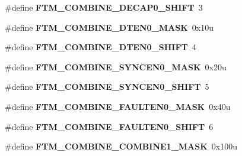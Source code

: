 \begin{DoxyCompactItemize}
\item 
\hypertarget{group___f_t_m___register___masks_ga4bfcf4d8cf838ad852c50cf589fd3d95}{}\#define {\bfseries F\+T\+M\+\_\+\+C\+O\+M\+B\+I\+N\+E\+\_\+\+D\+E\+C\+A\+P0\+\_\+\+S\+H\+I\+F\+T}~3\label{group___f_t_m___register___masks_ga4bfcf4d8cf838ad852c50cf589fd3d95}

\item 
\hypertarget{group___f_t_m___register___masks_ga9722d2bdaba256dd90324aa6b199ee4f}{}\#define {\bfseries F\+T\+M\+\_\+\+C\+O\+M\+B\+I\+N\+E\+\_\+\+D\+T\+E\+N0\+\_\+\+M\+A\+S\+K}~0x10u\label{group___f_t_m___register___masks_ga9722d2bdaba256dd90324aa6b199ee4f}

\item 
\hypertarget{group___f_t_m___register___masks_gaab1a185d98eb899fea411daf0386858a}{}\#define {\bfseries F\+T\+M\+\_\+\+C\+O\+M\+B\+I\+N\+E\+\_\+\+D\+T\+E\+N0\+\_\+\+S\+H\+I\+F\+T}~4\label{group___f_t_m___register___masks_gaab1a185d98eb899fea411daf0386858a}

\item 
\hypertarget{group___f_t_m___register___masks_gafd208921dc5f1d7dde730c67776bce8a}{}\#define {\bfseries F\+T\+M\+\_\+\+C\+O\+M\+B\+I\+N\+E\+\_\+\+S\+Y\+N\+C\+E\+N0\+\_\+\+M\+A\+S\+K}~0x20u\label{group___f_t_m___register___masks_gafd208921dc5f1d7dde730c67776bce8a}

\item 
\hypertarget{group___f_t_m___register___masks_gab9eba65827e4b667e34b89f58640b960}{}\#define {\bfseries F\+T\+M\+\_\+\+C\+O\+M\+B\+I\+N\+E\+\_\+\+S\+Y\+N\+C\+E\+N0\+\_\+\+S\+H\+I\+F\+T}~5\label{group___f_t_m___register___masks_gab9eba65827e4b667e34b89f58640b960}

\item 
\hypertarget{group___f_t_m___register___masks_gad373b84d922eba1365283a7ebb5d87f4}{}\#define {\bfseries F\+T\+M\+\_\+\+C\+O\+M\+B\+I\+N\+E\+\_\+\+F\+A\+U\+L\+T\+E\+N0\+\_\+\+M\+A\+S\+K}~0x40u\label{group___f_t_m___register___masks_gad373b84d922eba1365283a7ebb5d87f4}

\item 
\hypertarget{group___f_t_m___register___masks_gac0b55b271d7734489d9e53b0d2ad1a64}{}\#define {\bfseries F\+T\+M\+\_\+\+C\+O\+M\+B\+I\+N\+E\+\_\+\+F\+A\+U\+L\+T\+E\+N0\+\_\+\+S\+H\+I\+F\+T}~6\label{group___f_t_m___register___masks_gac0b55b271d7734489d9e53b0d2ad1a64}

\item 
\hypertarget{group___f_t_m___register___masks_ga5378f59bc8234381865e973deb638b6f}{}\#define {\bfseries F\+T\+M\+\_\+\+C\+O\+M\+B\+I\+N\+E\+\_\+\+C\+O\+M\+B\+I\+N\+E1\+\_\+\+M\+A\+S\+K}~0x100u\label{group___f_t_m___register___masks_ga5378f59bc8234381865e973deb638b6f}


\end{DoxyCompactItemize}
